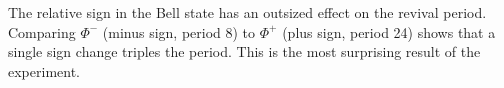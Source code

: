 The relative sign in the Bell state has an outsized effect on the
revival period. Comparing $\Phi^-$ (minus sign, period 8) to $\Phi^+$
(plus sign, period 24) shows that a single sign change triples the
period. This is the most surprising result of the experiment.
